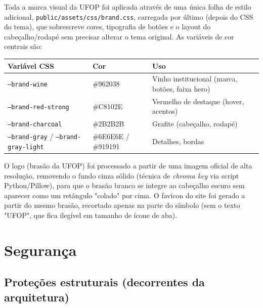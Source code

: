 \documentclass[11pt,a4paper]{article}
\begin{document}
Toda a marca visual da UFOP foi aplicada através de uma única folha de estilo adicional,
\texttt{public/assets/css/brand.css}, carregada por último (depois do CSS do tema), que
sobrescreve cores, tipografia de botões e o layout do cabeçalho/rodapé sem precisar alterar o
tema original. As variáveis de cor centrais são:

\begin{center}
\begin{tabular}{@{}lll@{}}
\toprule
\textbf{Variável CSS} & \textbf{Cor} & \textbf{Uso} \\
\midrule
\texttt{--brand-wine} & \#962038 & Vinho institucional (marca, botões, faixa hero) \\
\texttt{--brand-red-strong} & \#C8102E & Vermelho de destaque (hover, acentos) \\
\texttt{--brand-charcoal} & \#2B2B2B & Grafite (cabeçalho, rodapé) \\
\texttt{--brand-gray} / \texttt{--brand-gray-light} & \#6E6E6E / \#919191 & Detalhes, bordas \\
\bottomrule
\end{tabular}
\end{center}

O logo (brasão da UFOP) foi processado a partir de uma imagem oficial de alta resolução,
removendo o fundo cinza sólido (técnica de \emph{chroma key} via script Python/Pillow), para
que o brasão branco se integre ao cabeçalho escuro sem aparecer como um retângulo "colado" por
cima. O favicon do site foi gerado a partir do mesmo brasão, recortado apenas na parte do
símbolo (sem o texto "UFOP", que fica ilegível em tamanho de ícone de aba).

\section{Segurança}
\label{sec:seguranca}

\subsection{Proteções estruturais (decorrentes da arquitetura)}
\end{document}
